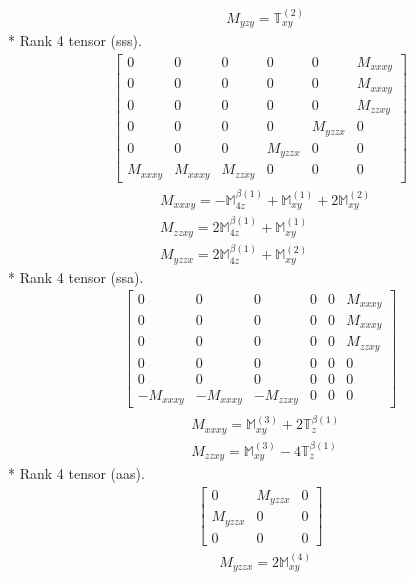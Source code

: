\documentclass[fleqn,8pt,landscape]{jsarticle}
\begin{document}
\begin{align*}
& M_{yzy} = \mathbb{T}_{xy}^{(2)}
\end{align*}
* Rank 4 tensor (sss).
\begin{align*}
\begin{bmatrix} 0 & 0 & 0 & 0 & 0 & M_{xxxy} \\ 0 & 0 & 0 & 0 & 0 & M_{xxxy} \\ 0 & 0 & 0 & 0 & 0 & M_{zzxy} \\ 0 & 0 & 0 & 0 & M_{yzzx} & 0 \\ 0 & 0 & 0 & M_{yzzx} & 0 & 0 \\ M_{xxxy} & M_{xxxy} & M_{zzxy} & 0 & 0 & 0 \end{bmatrix}
\end{align*}
\begin{align*}
& M_{xxxy} = - \mathbb{M}_{4z}^{\beta(1)} + \mathbb{M}_{xy}^{(1)} + 2 \mathbb{M}_{xy}^{(2)} \\
& M_{zzxy} = 2 \mathbb{M}_{4z}^{\beta(1)} + \mathbb{M}_{xy}^{(1)} \\
& M_{yzzx} = 2 \mathbb{M}_{4z}^{\beta(1)} + \mathbb{M}_{xy}^{(2)}
\end{align*}
* Rank 4 tensor (ssa).
\begin{align*}
\begin{bmatrix} 0 & 0 & 0 & 0 & 0 & M_{xxxy} \\ 0 & 0 & 0 & 0 & 0 & M_{xxxy} \\ 0 & 0 & 0 & 0 & 0 & M_{zzxy} \\ 0 & 0 & 0 & 0 & 0 & 0 \\ 0 & 0 & 0 & 0 & 0 & 0 \\ - M_{xxxy} & - M_{xxxy} & - M_{zzxy} & 0 & 0 & 0 \end{bmatrix}
\end{align*}
\begin{align*}
& M_{xxxy} = \mathbb{M}_{xy}^{(3)} + 2 \mathbb{T}_{z}^{\beta(1)} \\
& M_{zzxy} = \mathbb{M}_{xy}^{(3)} - 4 \mathbb{T}_{z}^{\beta(1)}
\end{align*}
* Rank 4 tensor (aas).
\begin{align*}
\begin{bmatrix} 0 & M_{yzzx} & 0 \\ M_{yzzx} & 0 & 0 \\ 0 & 0 & 0 \end{bmatrix}
\end{align*}
\begin{align*}
& M_{yzzx} = 2 \mathbb{M}_{xy}^{(4)}
\end{align*}
\end{document}

